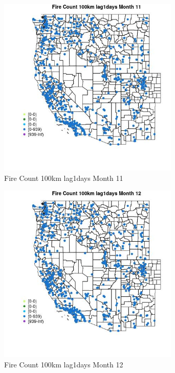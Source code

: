 \begin{figure} 
\centering  
\includegraphics[width=0.77\textwidth]{Code_Outputs/Report_ML_input_PM25_Step4_part_e_de_duplicated_aves_compiled_2019-05-21wNAs_MapObsMo11Fire_Count_100km_lag1days.jpg} 
\caption{\label{fig:Report_ML_input_PM25_Step4_part_e_de_duplicated_aves_compiled_2019-05-21wNAsMapObsMo11Fire_Count_100km_lag1days}Fire Count 100km lag1days Month 11} 
\end{figure} 
 

\begin{figure} 
\centering  
\includegraphics[width=0.77\textwidth]{Code_Outputs/Report_ML_input_PM25_Step4_part_e_de_duplicated_aves_compiled_2019-05-21wNAs_MapObsMo12Fire_Count_100km_lag1days.jpg} 
\caption{\label{fig:Report_ML_input_PM25_Step4_part_e_de_duplicated_aves_compiled_2019-05-21wNAsMapObsMo12Fire_Count_100km_lag1days}Fire Count 100km lag1days Month 12} 
\end{figure} 
 


